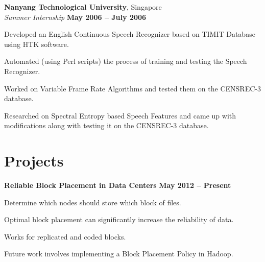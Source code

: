 \documentclass[margin,line]{resume}
\begin{document}
\begin{resume}
    \textbf{Nanyang Technological University}, Singapore \\%
    \textsl{Summer Internship} \hfill \textbf{May 2006 -- July 2006}
    \begin{list2}
    \item Developed an English Continuous Speech Recognizer based on TIMIT Database using HTK software.
    \item Automated (using Perl scripts) the process of training and testing the Speech Recognizer.
    \item Worked on Variable Frame Rate Algorithms and tested them on the CENSREC-3 database.
    \item Researched on Spectral Entropy based Speech Features and came up with modifications along with testing it on the CENSREC-3 database.
    \end{list2}

\newpage    

\section{\mysidestyle Projects}
  \textbf{Reliable Block Placement in Data Centers} \hfill \textbf{May 2012 -- Present}
  \begin{list2}
  \item Determine which nodes should store which block of files. 
  \item Optimal block placement can significantly increase the reliability of data. 
  \item Works for replicated and coded blocks. 
  \item Future work involves implementing a Block Placement Policy in Hadoop.
  \end{list2}
  


\end{resume}
\end{document}
